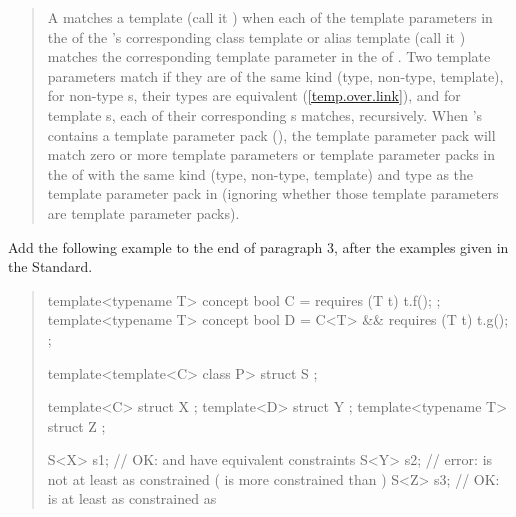 \begin{quote}
\setcounter{Paras}{2}
\pnum
A  matches  a template 
  (call it ) when each of the 
template parameters in the  of the 
's corresponding class template or alias 
template (call it  ) matches the corresponding template parameter in 
the  of .
% 
Two template parameters match if they are of the same kind (type, non-type, 
template), for non-type s, their types are 
equivalent (\ref{temp.over.link}), and for template 
s, each of their corresponding
s matches, recursively. 
% 
When 's  
contains a template parameter pack (), the template 
parameter pack will match zero or more template parameters or template 
parameter packs in the  of
 with the same kind (type, non-type, template) and type as the template 
parameter pack in  (ignoring whether those template parameters are
template parameter packs).
\end{quote}

Add the following example to the end of paragraph 3, after the
examples given in the \Cpp Standard.

\begin{quote}
\begin{addedblock}
\enterexample
\begin{codeblock}
template<typename T> concept bool C = requires (T t) { t.f(); };
template<typename T> concept bool D = C<T> && requires (T t) { t.g(); };

template<template<C> class P>
  struct S { };

template<C> struct X { };
template<D> struct Y { };
template<typename T> struct Z { };

S<X> s1; // OK:  and  have equivalent constraints
S<Y> s2; // error:  is not at least as constrained  ( is more constrained than )
S<Z> s3; // OK:  is at least as constrained as 
\end{codeblock}
\exitexample
\end{addedblock}
\end{quote}


